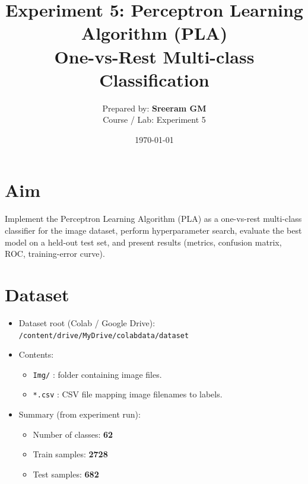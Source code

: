 \documentclass[11pt,a4paper]{article}
\title{Experiment 5: Perceptron Learning Algorithm (PLA) \\ \large One-vs-Rest Multi-class Classification}
\author{Prepared by: \textbf{Sreeram GM} \\
Course / Lab: Experiment 5}
\date{\today}
\begin{document}
\maketitle
\tableofcontents
\bigskip

\section{Aim}
Implement the Perceptron Learning Algorithm (PLA) as a one-vs-rest multi-class classifier for the image dataset, perform hyperparameter search, evaluate the best model on a held-out test set, and present results (metrics, confusion matrix, ROC, training-error curve).

\section{Dataset}
\begin{itemize}
  \item Dataset root (Colab / Google Drive): \texttt{/content/drive/MyDrive/colabdata/dataset}
  \item Contents:
    \begin{itemize}
      \item \texttt{Img/} : folder containing image files.
      \item \texttt{*.csv} : CSV file mapping image filenames to labels.
    \end{itemize}
  \item Summary (from experiment run):
    \begin{itemize}
      \item Number of classes: \textbf{62}
      \item Train samples: \textbf{2728}
      \item Test samples: \textbf{682}
    \end{itemize}
\end{itemize}
\end{document}
